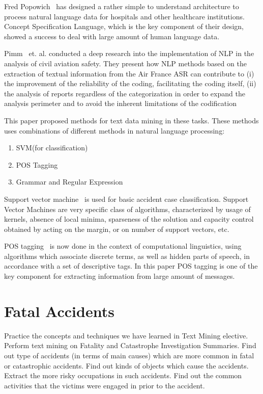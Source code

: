 \documentclass[DIV=calc, paper=a4, fontsize=11pt, twocolumn]{scrartcl}	 %
\begin{document}
Fred Popowich~\cite{popowich2005using} has designed a rather simple to
understand architecture to process natural language data for hospitals
and other healthcare institutions. Concept Specification Language,
which is the key component of their design, showed a success to deal
with large amount of human language data.


Pimm~\cite{pimm2012natural} et. al. conducted a deep research into the implementation of NLP
in the analysis of civil aviation safety. They present how NLP methods based on the
extraction of textual information from the Air France ASR
can contribute to (i) the improvement of the reliability of
the coding, facilitating the coding itself, (ii) the analysis of
reports regardless of the categorization in order to expand
the analysis perimeter and to avoid the inherent limitations
of the codification


This paper proposed methods for text data mining in these tasks. These
methods uses combinations of different methods in natural language
processing:

\begin{enumerate}
\item SVM(for classification)
\item POS Tagging
\item Grammar and Regular Expression
\end{enumerate}

Support vector machine~\cite{svm} is used for basic accident case
classification. Support Vector Machines are very specific class of
algorithms, characterized by usage of kernels, absence of local
minima, sparseness of the solution and capacity control obtained by
acting on the margin, or on number of support vectors, etc.

POS tagging~\cite{pos} is now done in the context of computational linguistics,
using algorithms which associate discrete terms, as well as hidden
parts of speech, in accordance with a set of descriptive tags. In this
paper POS tagging is one of the key component for extracting
information from large amount of messages.




\section{Fatal Accidents}
Practice the concepts and techniques we have learned in Text Mining
elective. Perform text mining on Fatality and Catastrophe
Investigation Summaries. Find out type of accidents (in terms of main
causes) which are more common in fatal or catastrophic accidents. Find
out kinds of objects which cause the accidents. Extract the more risky
occupations in such accidents. Find out the common activities that the
victims were engaged in prior to the accident.
\end{document}
